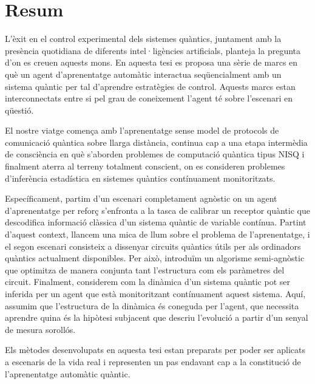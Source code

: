 \chapter*{Resum}
L’èxit en el control experimental dels sistemes quàntics, juntament amb la presència quotidiana de diferents intel·ligències artificials, planteja la pregunta d’on es creuen aquests mons. En aquesta tesi es proposa una sèrie de marcs en què un agent d’aprenentatge automàtic interactua seqüencialment amb un sistema quàntic per tal d’aprendre estratègies de control. Aquests marcs estan interconnectats entre si pel grau de coneixement l’agent té sobre l’escenari en qüestió.

El nostre viatge comença amb l’aprenentatge sense model de protocols de comunicació quàntica sobre llarga distància, continua cap a una etapa intermèdia de consciència en què s’aborden problemes de computació quàntica tipus NISQ i finalment aterra al terreny totalment conscient, on es consideren problemes d’inferència estadística en sistemes quàntics contínuament monitoritzats.

Específicament, partim d’un escenari completament agnòstic on un agent d’aprenentatge per reforç s’enfronta a la tasca de calibrar un receptor quàntic que descodifica informació clàssica d’un sistema quàntic de variable contínua. Partint d’aquest context, llancem una mica de llum sobre el problema de l’aprenentatge, i el segon escenari consisteix a dissenyar circuits quàntics útils per als ordinadors quàntics actualment disponibles. Per això, introduïm un algorisme semi-agnòstic que optimitza de manera conjunta tant l’estructura com els paràmetres del circuit. Finalment, considerem com la dinàmica d’un sistema quàntic pot ser inferida per un agent que està monitoritzant contínuament aquest sistema. Aquí, assumim que l’estructura de la dinàmica és coneguda per l’agent, que necessita aprendre quina és la hipòtesi subjacent que descriu l’evolució a partir d’un senyal de mesura sorollós.

Els mètodes desenvolupats en aquesta tesi estan preparats per poder ser aplicats a escenaris de la vida real i representen un pas endavant cap a la constitució de l’aprenentatge automàtic quàntic.
\setcounter{page}{1}
